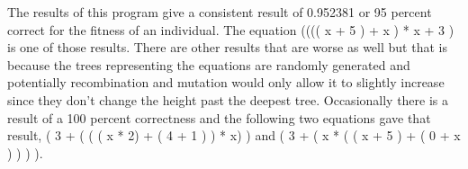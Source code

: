 \par
The results of this program give a consistent result of 0.952381 or 95 percent correct for the fitness of an individual. The equation (((( x + 5 ) + x ) * x + 3 ) is one of those results. There are other results that are worse as well but that is because the trees representing the equations are randomly generated and potentially recombination and mutation would only allow it to slightly increase since they don't change the height past the deepest tree. Occasionally there is a result of a 100 percent correctness and the following two equations gave that result, ( 3 + ( ( ( x * 2) + ( 4 + 1 ) ) * x) ) and ( 3 + ( x * ( ( x + 5 ) + ( 0 + x ) ) ) ).